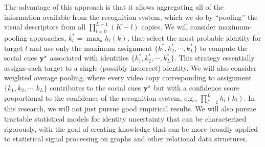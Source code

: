 The advantage of this approach is that it allows aggregating all of the information available from the recognition system, which we do by ``pooling'' the visual descriptors from all $\prod_{l=0}^{L-1}(K-l)$ copies. We will consider maximum-pooling approaches, $k_l^{*}=\max_{k}h_l(k)$, that select the most probable identity for target $l$ and use only the maximum assignment $\{k_1^{*}, k_2^{*}, \cdots, k_L^{*}\}$ to compute the social cues ${\bf y}^s$ associated with identities $\{k_1^{*}, k_2^{*}, \cdots, k_L^{*}\}$. This strategy essentially assigns each target to a single (possibly incorrect) identity. We will also consider weighted average pooling, where every video copy corresponding to assignment $\{k_1, k_2, \cdots, k_L\}$ contributes to the social cues ${\bf y}^s$ but with a confidence score proportional to the confidence of the recognition system, e.g., $\prod_{l=1}^{L}h_l(k_l)$. In this research, we will not just pursue good empirical results. We will also pursue tractable statistical models for identity uncertainty that can be characterized rigorously, with the goal of creating knowledge that can be more broadly applied to statistical signal processing on graphs and other relational data structures. 